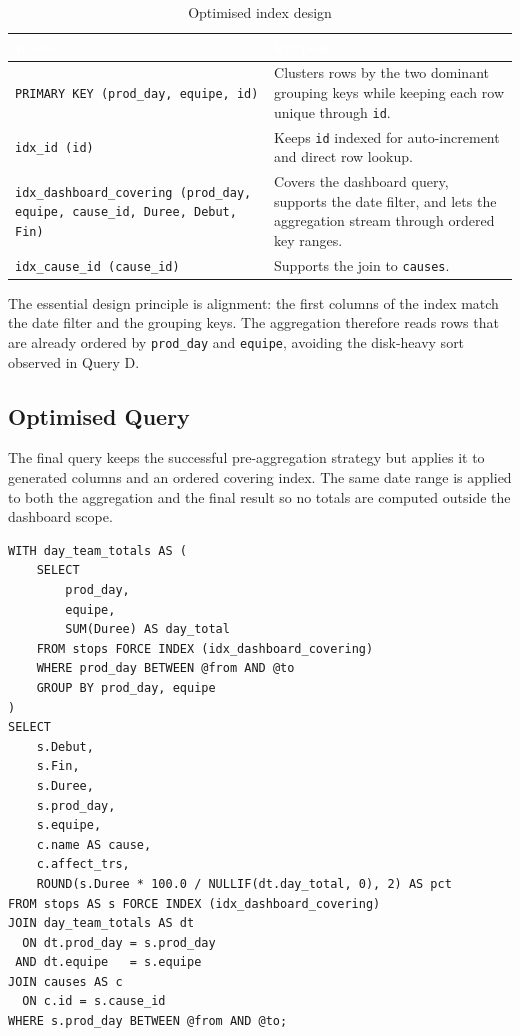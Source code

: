 \begin{table}[H]
\centering
\small
\caption{Optimised index design}
\label{tab:chapter3-6}
\setlength{\extrarowheight}{2pt}
\begin{tabular}{@{}>{\raggedright\arraybackslash}p{5.4cm}>{\raggedright\arraybackslash}p{8.3cm}@{}}
    \toprule
    \rowcolor[HTML]{1A5490}
    \textcolor{white}{\textbf{Index}} & \textcolor{white}{\textbf{Purpose}} \\
    \midrule
    \rowcolor[HTML]{E8F4F8}
    \texttt{PRIMARY KEY (prod\_day, equipe, id)} & Clusters rows by the two dominant grouping keys while keeping each row unique through \texttt{id}. \\
    \rowcolor[HTML]{FFFFFF}
    \texttt{idx\_id (id)} & Keeps \texttt{id} indexed for auto-increment and direct row lookup. \\
    \rowcolor[HTML]{E8F4F8}
    \texttt{idx\_dashboard\_covering (prod\_day, equipe, cause\_id, Duree, Debut, Fin)} & Covers the dashboard query, supports the date filter, and lets the aggregation stream through ordered key ranges. \\
    \rowcolor[HTML]{FFFFFF}
    \texttt{idx\_cause\_id (cause\_id)} & Supports the join to \texttt{causes}. \\
    \bottomrule
\end{tabular}
\end{table}

The essential design principle is alignment: the first columns of the index match the date filter and the grouping keys. The aggregation therefore reads rows that are already ordered by \texttt{prod\_day} and \texttt{equipe}, avoiding the disk-heavy sort observed in Query D.

\subsection{Optimised Query}

The final query keeps the successful pre-aggregation strategy but applies it to generated columns and an ordered covering index. The same date range is applied to both the aggregation and the final result so no totals are computed outside the dashboard scope.

\begin{verbatim}
WITH day_team_totals AS (
    SELECT
        prod_day,
        equipe,
        SUM(Duree) AS day_total
    FROM stops FORCE INDEX (idx_dashboard_covering)
    WHERE prod_day BETWEEN @from AND @to
    GROUP BY prod_day, equipe
)
SELECT
    s.Debut,
    s.Fin,
    s.Duree,
    s.prod_day,
    s.equipe,
    c.name AS cause,
    c.affect_trs,
    ROUND(s.Duree * 100.0 / NULLIF(dt.day_total, 0), 2) AS pct
FROM stops AS s FORCE INDEX (idx_dashboard_covering)
JOIN day_team_totals AS dt
  ON dt.prod_day = s.prod_day
 AND dt.equipe   = s.equipe
JOIN causes AS c
  ON c.id = s.cause_id
WHERE s.prod_day BETWEEN @from AND @to;
\end{verbatim}

